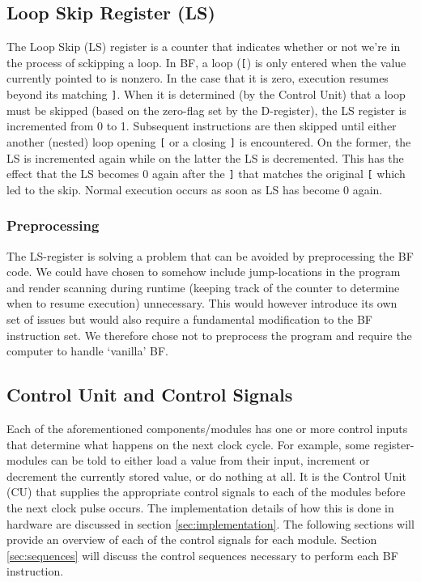 \subsection{Loop Skip Register (LS)} \label{sec:architecture:loopskip}
The Loop Skip (LS) register is a counter that indicates whether or not we're in the process of sckipping a loop. In BF, a loop (\texttt{[}) is only entered when the value currently pointed to is nonzero. In the case that it is zero, execution resumes beyond its matching \texttt{]}. When it is determined (by the Control Unit) that a loop must be skipped (based on the zero-flag set by the D-register), the LS register is incremented from 0 to 1. Subsequent instructions are then skipped until either another (nested) loop opening \texttt{[} or a closing \texttt{]} is encountered. On the former, the LS is incremented again while on the latter the LS is decremented. This has the effect that the LS becomes 0 again after the \texttt{]} that matches the original \texttt{[} which led to the skip. Normal execution occurs as soon as LS has become 0 again.

\subsubsection{Preprocessing}
The LS-register is solving a problem that can be avoided by preprocessing the BF code. We could have chosen to somehow include jump-locations in the program and render scanning during runtime (keeping track of the counter to determine when to resume execution) unnecessary. This would however introduce its own set of issues but would also require a fundamental modification to the BF instruction set. We therefore chose not to preprocess the program and require the computer to handle `vanilla' BF.
    
\subsection{Control Unit and Control Signals} \label{sec:architecture:signals}
Each of the aforementioned components/modules has one or more control inputs that determine what happens on the next clock cycle. For example, some register-modules can be told to either load a value from their input, increment or decrement the currently stored value, or do nothing at all. It is the Control Unit (CU) that supplies the appropriate control signals to each of the modules before the next clock pulse occurs. The implementation details of how this is done in hardware are discussed in section \ref{sec:implementation}. The following sections will provide an overview of each of the control signals for each module. Section \ref{sec:sequences} will discuss the control sequences necessary to perform each BF instruction.

